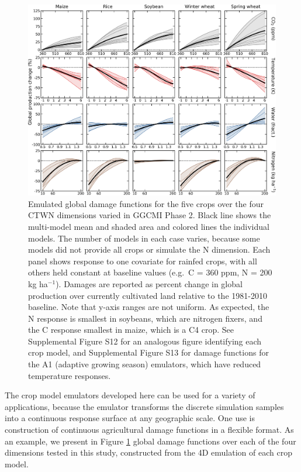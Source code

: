\documentclass[gmdd]{copernicus} %
\begin{document}
\begin{figure}[h!]
    \centering
    \includegraphics[width = 16.3cm]{figures/em_CTWN_all_crops.png}
    \caption{
    Emulated global damage functions for the five crops over the four CTWN dimensions varied in GGCMI Phase 2.
    Black line shows the multi-model mean and shaded area and colored lines the individual models. The number of models in each case varies, because some models did not provide all crops or simulate the N dimension. 
    Each panel shows response to one covariate for rainfed crops, with all others held constant at baseline values (e.g.\ C = 360 ppm, N = 200 kg ha$^{-1}$). 
    Damages are reported as percent change in global production over currently cultivated land relative to the 1981-2010 baseline. Note that y-axis ranges are not uniform.
    As expected, the N response is smallest in soybeans, which are nitrogen fixers, and the C response smallest in maize, which is a C4 crop.
    See Supplemental Figure S12 for an analogous figure identifying each crop model, and Supplemental Figure S13 for damage functions for the A1 (adaptive growing season) emulators, which have reduced temperature responses.
    }
    \label{fig:all_dims}
\end{figure}

The crop model emulators developed here can be used for a variety of applications, because the emulator transforms the discrete simulation samples into a continuous response surface at any geographic scale. One use is construction of continuous agricultural damage functions in a flexible format. 
As an example, we present in  Figure \ref{fig:all_dims} global damage functions over each of the four dimensions tested in this study, constructed from the 4D emulation of each crop model.
\end{document}
